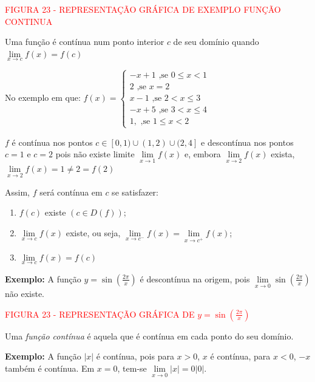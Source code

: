 \documentclass[oneside,a4paper,12pt]{article}
\begin{document}
\vspace{250pt}
\begin{center}
	\textcolor{red}{FIGURA 23 - REPRESENTAÇÃO GRÁFICA DE EXEMPLO FUNÇÃO CONTINUA}
\end{center}

Uma função é contínua num ponto interior $c$ de seu domínio quando $\lim\limits_{x \rightarrow c}f(x) = f(c)$

No exemplo em que: $f(x) = \begin{cases}
-x + 1 \text{ ,se } 0 \leq x < 1 \\
2	\text{ ,se } x = 2 \\
x-1 \text{ ,se } 2 < x \leq 3 \\
-x + 5 \text{ ,se } 3 < x \leq 4 \\
1, \text{ ,se } 1 \leq x < 2
\end{cases}
$

$f$ é contínua nos pontos $c \in [0,1) \cup (1,2) \cup (2,4]$ e descontínua nos pontos $c=1$ e $c=2$ pois não existe limite $\lim\limits_{x \rightarrow 1}f(x)$ e, embora $\lim\limits_{x \rightarrow 2}f(x)$ exista, $\lim\limits_{x \rightarrow 2}f(x) = 1 \neq 2 = f(2)$

Assim, $f$ será contínua em $c$ se satisfazer:
\begin{enumerate}
	\item $f(c)$ existe $(c \in D(f))$;
	\item $\lim\limits_{x \rightarrow c}f(x)$ existe, ou seja, $\lim\limits_{x \rightarrow c^{-}}f(x) = \lim\limits_{x \rightarrow c^{+}}f(x)$;
	\item $\lim\limits_{x \rightarrow c}f(x) = f(c)$
\end{enumerate}

{\bf Exemplo: } A função $y = \sin(\frac{2\pi}{x})$ é descontínua na origem, pois $\lim\limits_{x \rightarrow 0}\sin(\frac{2\pi}{x})$ não existe.

\vspace{250pt}
\begin{center}
	\textcolor{red}{FIGURA 23 - REPRESENTAÇÃO GRÁFICA DE $y = \sin(\frac{2\pi}{x})$}
\end{center}

Uma \emph{função contínua} é aquela que é contínua em cada ponto do seu domínio.

{\bf Exemplo: } A função $|x|$ é contínua, pois para $x>0$, $x$ é contínua, para $x<0$, $-x$ também é contínua. Em $x=0$, tem-se $\lim\limits_{x \rightarrow 0}|x| = 0 |0|$.
\end{document}
